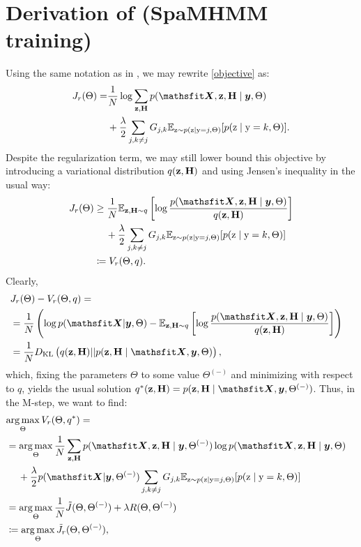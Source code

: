 \section{Derivation of  (SpaMHMM training)}
\label{sec:proof_em_reg}
Using the same notation as in , we may rewrite \eqref{objective} as:
\begin{align}
J_r(\Theta) = &\frac{1}{N}\log \sum_{\rvz,\rmH} p(\tX,\rvz,\rmH \mid \vy,\Theta) \nonumber\\
& +\frac{\reg}{2} \sum_{j,k\neq j} \emG_{j,k} \E_{\rz \sim p(\rz \mid \ry=j, \Theta)} [ p(\rz \mid \ry=k, \Theta) ].
\end{align}
Despite the regularization term, we may still lower bound this objective by introducing a variational distribution $q({\mathbf{z}},{\mathbf{H}})$ and using Jensen's inequality in the usual way:
\begin{align}
J_r(\Theta) &\geq \frac{1}{N} \E_{\rvz,\rmH \sim q} \left[\log \frac{p(\tX,\rvz,\rmH \mid \vy,\Theta)}{q(\rvz,\rmH)} \right] \nonumber\\
&\mathbin{\hphantom{=}}{} + \frac{\reg}{2} \sum_{j,k\neq j} \emG_{j,k} \E_{\rz \sim p(\rz \mid \ry=j, \Theta)} [ p(\rz \mid \ry=k, \Theta) ] \nonumber\\
&\coloneqq V_r(\Theta, q).
\end{align}
Clearly,
\begin{align}
\lefteqn{J_r(\Theta) - V_r(\Theta, q) =}\nonumber\\
&=\frac{1}{N} \left(\log p(\tX|\vy,\Theta) - \E_{\rvz,\rmH \sim q} \left[\log \frac{p(\tX,\rvz,\rmH \mid \vy,\Theta)}{q(\rvz,\rmH)} \right] \right) \nonumber\\
&= \frac{1}{N} \KL \left(q(\rvz,\rmH) || p(\rvz,\rmH \mid \tX,\vy,\Theta)  \right),
\end{align}
which, fixing the parameters $\Theta$ to some value $\Theta^{(-)}$ and minimizing with respect to $q$, yields the usual solution $q^*(\rvz,\rmH) = p(\rvz,\rmH \mid \tX,\vy,\Theta^{(-)})$. Thus, in the M-step, we want to find:
\begin{align}
\lefteqn{\argmax_\Theta V_r(\Theta, q^*) =} \nonumber\\
& =\argmax_\Theta \frac{1}{N}\sum_{\rvz,\rmH} p(\tX,\rvz,\rmH \mid \vy,\Theta^{(-)}) \log p(\tX,\rvz,\rmH \mid \vy,\Theta) \nonumber\\
& \mathbin{\hphantom{=}}{}+ \frac{\reg}{2} p(\tX|\vy,\Theta^{(-)}) \sum_{j,k\neq j} \emG_{j,k} \E_{\rz \sim p(\rz \mid \ry=j, \Theta)} [ p(\rz \mid \ry=k, \Theta) ] \nonumber\\
& = \argmax_\Theta \frac{1}{N}\tilde{J}(\Theta, \Theta^{(-)}) + \reg R(\Theta, \Theta^{(-)}) \nonumber\\
& \coloneqq \argmax_\Theta \tilde{J}_r(\Theta, \Theta^{(-)}),
\end{align}
